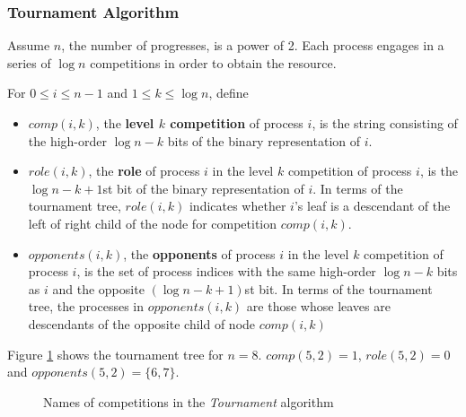 \documentclass[11pt]{article}
\begin{document}
\subsubsection{Tournament Algorithm}
\label{sec:org5e94024}
Assume \(n\), the number of progresses, is a power of 2. Each process engages in a series of
\(\log n\) competitions in order to obtain the resource.

For \(0\le i\le n-1\) and \(1\le k\le\log n\), define
\begin{itemize}
\item \(comp(i,k)\), the \textbf{level \(k\) competition} of process \(i\), is the string consisting of the
high-order \(\log n-k\) bits of the binary representation of \(i\).
\item \(role(i,k)\), the \textbf{role} of process \(i\) in the level \(k\) competition of process \(i\), is the
\(\log n-k+1\)st bit of the binary representation of \(i\). In terms of the tournament tree,
\(role(i,k)\) indicates whether \(i\)'s leaf is a descendant of the left of right child of the node
for competition \(comp(i,k)\).
\item \(opponents(i,k)\), the \textbf{opponents} of process \(i\) in the level \(k\) competition of process \(i\),
is the set of process indices with the same high-order \(\log n-k\) bits as \(i\) and the opposite
\((\log n-k+1)\)st bit. In terms of the tournament tree, the processes in \(opponents(i,k)\) are
those whose leaves are descendants of the opposite child of node \(comp(i,k)\)
\end{itemize}

\begin{examplle}[]
Figure \ref{fig:10.9} shows the tournament tree for \(n=8\). \(comp(5,2)=1\), \(role(5,2)=0\) and \(opponents(5,2)=\{6,7\}\).
\end{examplle}

\begin{figure}[H]
\label{fig:10.9}
\begin{center}\end{center}
\caption{Names of competitions in the \textit{Tournament} algorithm}
\end{figure}
\end{document}
